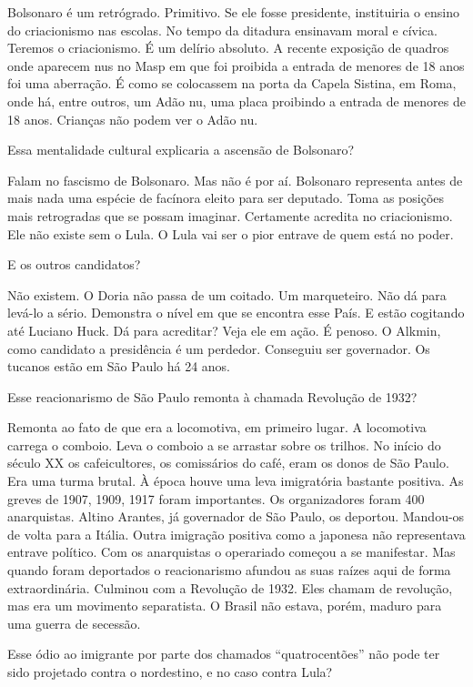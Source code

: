 \falaM Bolsonaro é um retrógrado. Primitivo. Se ele fosse presidente,
instituiria o ensino do criacionismo nas escolas. No tempo da ditadura
ensinavam moral e cívica. Teremos o criacionismo. É um delírio absoluto.
A recente exposição de quadros onde aparecem nus no Masp em que foi
proibida a entrada de menores de 18 anos foi uma aberração. É como se
colocassem na porta da Capela Sistina, em Roma, onde há, entre outros,
um Adão nu, uma placa proibindo a entrada de menores de 18 anos.
Crianças não podem ver o Adão nu.

\falaG Essa mentalidade cultural explicaria a ascensão de Bolsonaro?

\falaM Falam no fascismo de Bolsonaro. Mas não é por aí. Bolsonaro
representa antes de mais nada uma espécie de facínora eleito para ser
deputado. Toma as posições mais retrogradas que se possam imaginar.
Certamente acredita no criacionismo. Ele não existe sem o Lula. O Lula
vai ser o pior entrave de quem está no poder.

\falaG E os outros candidatos?

\falaM Não existem. O Doria não passa de um coitado. Um marqueteiro. Não dá
para levá-lo a sério. Demonstra o nível em que se encontra esse País. E
estão cogitando até Luciano Huck. Dá para acreditar? Veja ele em ação. É
penoso. O Alkmin, como candidato a presidência é um perdedor. Conseguiu
ser governador. Os tucanos estão em São Paulo há 24 anos.

\falaG Esse reacionarismo de São Paulo remonta à chamada Revolução de 1932?

\falaM Remonta ao fato de que era a locomotiva, em primeiro lugar. A
locomotiva carrega o comboio. Leva o comboio a se arrastar sobre os
trilhos. No início do século XX os cafeicultores, os comissários do
café, eram os donos de São Paulo. Era uma turma brutal. À época houve
uma leva imigratória bastante positiva. As greves de 1907, 1909, 1917
foram importantes. Os organizadores foram 400 anarquistas. Altino
Arantes, já governador de São Paulo, os deportou. Mandou-os de volta
para a Itália. Outra imigração positiva como a japonesa não representava
entrave político. Com os anarquistas o operariado começou a se
manifestar. Mas quando foram deportados o reacionarismo afundou as suas
raízes aqui de forma extraordinária. Culminou com a Revolução de 1932.
Eles chamam de revolução, mas era um movimento separatista. O Brasil não
estava, porém, maduro para uma guerra de secessão.

\falaG Esse ódio ao imigrante por parte dos chamados ``quatrocentões'' não
pode ter sido projetado contra o nordestino, e no caso contra Lula?

